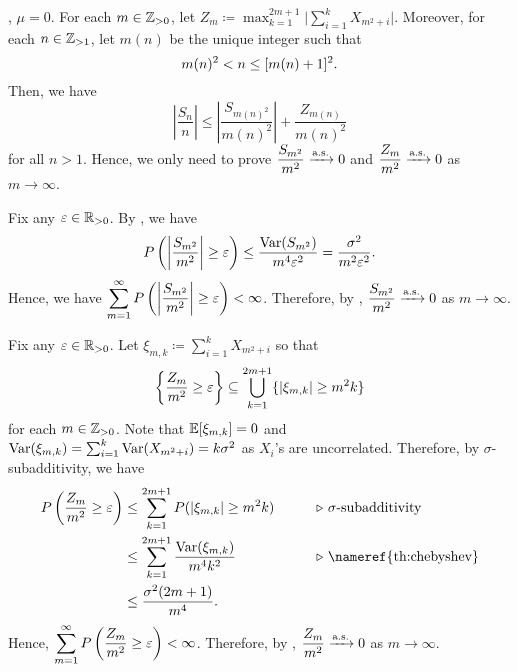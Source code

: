 \documentclass[../probability.tex]{subfiles}
\begin{document}
\begin{myproof}[Proof]
    \WLOG, \(\mu = 0\).
    For each \(m \in \ZZ_{>0}\), let \(Z_m \coloneqq \max_{k=1}^{2m+1} \bigl| \sum_{i=1}^k X_{m^2+i}
    \bigr|\). Moreover, for each \(n \in \ZZ_{>1}\), let \(m(n)\) be the unique integer such that
    \[
        m(n)^2 < n \le [m(n)+1]^2\text.
    \]
    Then, we have
    \[
        \left| \frac{S_n}{n} \right| \le \left| \frac{S_{m(n)^2}}{m(n)^2} \right|
        + \frac{Z_{m(n)}}{m(n)^2}
    \]
    for all \(n > 1\).
    Hence, we only need to prove \(\dfrac{S_{m^2}}{m^2} \xrightarrow{\mathrm{a.s.}} 0\) and \(\dfrac{Z_{m}}{m^2} \xrightarrow{\mathrm{a.s.}}
    0\) as \(m \to \infty\).
    \begin{itemize}
        \ii
        Fix any \(\veps \in \RR_{>0}\).
        By , we have
        \[
            P \left(\left|\frac{S_{m^2}}{m^2}\right| \ge \varepsilon\right)
            \le \frac{\operatorname{Var}(S_{m^2})}{m^4\varepsilon^2} = \frac{\sigma^2}{m^2\varepsilon^2}\text.
        \]
        Hence, we have \(\displaystyle \sum_{m=1}^\infty P \left(\left|\frac{S_{m^2}}{m^2}\right|
        \ge \varepsilon\right) < \infty\).
        Therefore, by , \(\dfrac{S_{m^2}}{m^2} \xrightarrow{\mathrm{a.s.}} 0\)
        as \(m \to \infty\).

        \ii
        Fix any \(\veps \in \RR_{>0}\).
        Let \(\xi_{m,k} \coloneqq \sum_{i=1}^k X_{m^2+i}\)
        so that
        \[
            \left\{ \frac{Z_m}{m^2} \ge \varepsilon \right\}
            \subseteq \bigcup_{k=1}^{2m+1} \{|\xi_{m,k}| \ge m^2 k\}
        \]
        for each \(m \in \ZZ_{>0}\).
        Note that \(\mathbb{E}[\xi_{m,k}] = 0\) and
        \(\operatorname{Var}(\xi_{m,k}) = \sum_{i=1}^k \operatorname{Var}(X_{m^2+i}) = k\sigma^2\)
        as \(X_i\)'s are uncorrelated.
        Therefore, by \(\sigma\)-subadditivity, we have
        \begin{alignat*}{2}
            P \left( \frac{Z_m}{m^2} \ge \veps \right)
            &\le \sum_{k=1}^{2m+1} P(|\xi_{m,k}| \ge m^2k) &\qquad
            &\comment{\(\sigma\)-subadditivity} \\
            &\le \sum_{k=1}^{2m+1} \frac{\Var(\xi_{m,k})}{m^4 k^2}
            && \comment{\nameref{th:chebyshev}} \\
            &\le \frac{\sigma^2(2m+1)}{m^4}\text.
        \end{alignat*}
        Hence, \(\displaystyle \sum_{m=1}^\infty P \left(\frac{Z_m}{m^2}
        \ge \varepsilon\right) < \infty\).
        Therefore, by , \(\dfrac{Z_m}{m^2} \xrightarrow{\mathrm{a.s.}} 0\) as \(m \to \infty\).
        \qedhere
    \end{itemize}
\end{myproof}
\end{document}
